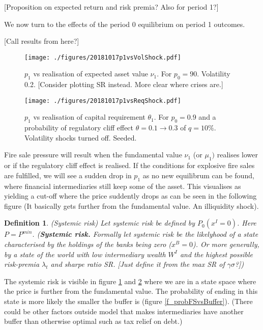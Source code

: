 \documentclass[11pt]{article}
\newtheorem{definition}{Definition}%
\begin{document}
[Proposition on expected return and risk premia? Also for period 1?]

We now turn to the effects of the period 0 equilibrium on period 1 outcomes.

[Call results from here?]





\begin{figure}[h] 
\centering
\texttt{[image: ./figures/20181017p1vsVolShock.pdf]}
\caption{$p_1$ vs realisation of expected asset value  $\nu_1$. For $p_0 = 90$. Volatility 0.2. [Consider plotting SR instead. More clear where crises are.]}
\label{f_price1vsvolshock}
\end{figure}

\begin{figure}[h]
\centering
\texttt{[image: ./figures/20181017p1vsReqShock.pdf]}
\caption{$p_1$ vs realisation of capital requirement $\theta_1$. For $p_0 = 0.9$ and a probability of regulatory cliff effect $\theta = 0.1  \rightarrow 0.3$ of $q = 10\% $. Volatility shocks turned off. Seeded.}
\label{f_price1vsRegShock}
\end{figure}

Fire sale pressure will result when the fundamental value $\nu_1$ (or $\mu_1)$ realises lower or if the regulatory cliff effect is realised. If the conditions for explosive fire sales are fulfilled, we will see a sudden drop in $p_1$ as no new equilibrum can be found, where financial intermediaries still keep some of the asset. This visualises as yielding a cut-off where the price suddently drops as can be seen in the following figure (It basically gets further from the fundamental value. An illiquidity shock).

\begin{definition} (Systemic risk)
Let systemic risk be defined by $P_0 (x^I=0)$. Here $P = P^{min}$.
(\textbf{Systemic risk.} Formally let systemic risk be the likelyhood of a state characterised by the holdings of the banks being zero ($x^B = 0$). Or more generally, by a state of the world with low intermediary wealth $W^I$ and the highest possible risk-premia $\lambda_t$ and sharpe ratio SR. [Just define it from the max SR of $\gamma\sigma$?])
\end{definition}

The systemic risk is visible in figure \ref{f_price1vsvolshock} and \ref{f_price1vsRegShock} where we are in a state space where the price is further from the fundamental value. The probability of ending in this state is more likely the smaller the buffer is (figure \ref{f_probFSvsBuffer}). (There could be other factors outside model that makes intermediaries have another buffer than otherwise optimal such as tax relief on debt.)
\end{document}
